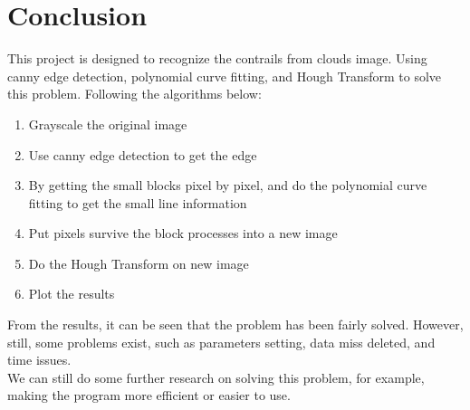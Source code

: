 \chapter{Conclusion}

This project is designed to recognize the contrails from clouds image. Using canny edge detection, polynomial curve fitting, and Hough Transform to solve this problem. Following the algorithms below:
\begin{enumerate}
\item Grayscale the original image
\item Use canny edge detection to get the edge
\item By getting the small blocks pixel by pixel, and do the polynomial curve fitting to get the small line information
\item Put pixels survive the block processes into a new image
\item Do the Hough Transform on new image
\item Plot the results
\end{enumerate}
From the results, it can be seen that the problem has been fairly solved. However, still, some problems exist, such as parameters setting, data miss deleted, and time issues.\\
We can still do some further research on solving this problem, for example, making the program more efficient or easier to use.
